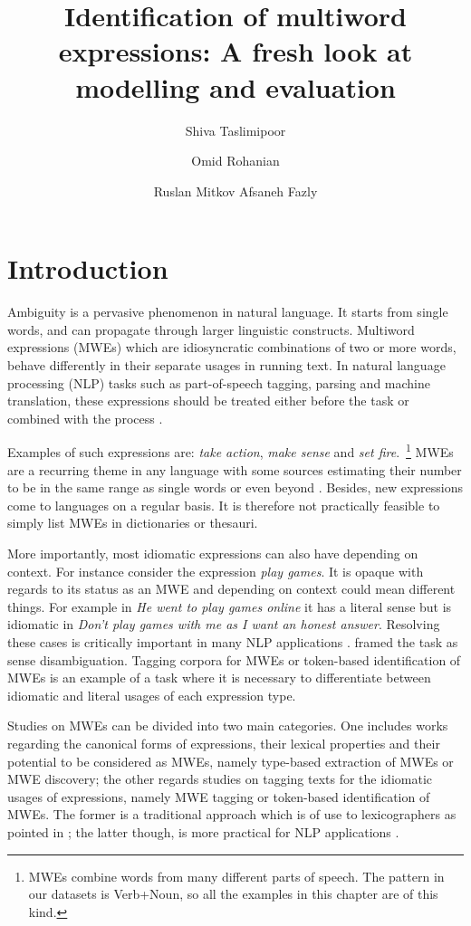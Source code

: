 \documentclass[output=paper
,modfonts
,nonflat]{langsci/langscibook}
\title{Identification of multiword expressions: A fresh look at modelling and evaluation}
\author{%
 Shiva Taslimipoor\affiliation{University of Wolverhampton}\and 
 Omid Rohanian\affiliation{University of Wolverhampton}\and 
 Ruslan Mitkov\affiliation{University of Wolverhampton}\lastand
 Afsaneh Fazly\affiliation{Thomson Reuters}
}
\begin{document}
\maketitle
\label{TASLIMIPOOR-CHAPTER}

\section{Introduction} 

Ambiguity is a pervasive phenomenon in natural language. It starts from single words, and can propagate through larger linguistic constructs. Multiword expressions (MWEs) which are idiosyncratic combinations of two or more words, behave differently in their separate usages in running text. In natural language processing (NLP) tasks such as part-of-speech tagging, parsing and machine translation, these expressions should be treated either before the task \citep{nivre2004} or combined with the process \citep{constant2012evaluating,kordoni2011proceedings,nasr:acl:2015}. 

Examples of such expressions are: \textit{take action}, \textit{make sense} and \textit{set fire}.~\footnote{MWEs combine words from many different parts of speech. The pattern in our datasets is Verb+Noun, so all the examples in this chapter are of this kind.} 
MWEs are a recurring theme in any language with some sources estimating their number to be in the same range as single words \citep{Jac97} or even beyond \citep{Sag2002a}. Besides, new expressions come to languages on a regular basis. It is therefore not practically feasible to simply list MWEs in dictionaries or thesauri. 

More importantly, most idiomatic expressions can also have  depending on context.
For instance consider the expression \textit{play games}. It is opaque with regards to its status as an MWE and depending on context could mean different things. For example in \textit{He went to play games online} it has a literal sense but is idiomatic in \textit{Don’t play games with me as I want an honest answer}. Resolving these cases is critically important in many NLP applications \citep{Katz06automaticidentification}. \cite{Katz06automaticidentification} framed the task as sense disambiguation. Tagging corpora for MWEs or token-based identification of MWEs is an example of a task where it is necessary to differentiate between idiomatic and literal usages of each expression type. 

Studies on MWEs can be divided into two main categories. One includes works regarding the canonical forms of expressions, their lexical properties and their potential to be considered as MWEs, namely type-based extraction of MWEs or MWE discovery; the other regards studies on tagging texts for the idiomatic usages of expressions, namely MWE tagging or token-based identification of MWEs. The former is a traditional approach which is of use to lexicographers as pointed in \cite{ramisch2014multiword}; the latter though, is more practical for NLP applications \citep{schneider-dimsum:2016}.
\end{document}
